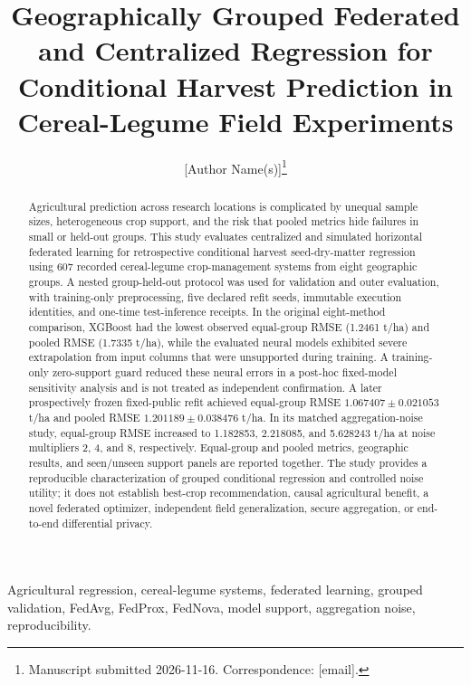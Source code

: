 \documentclass[journal]{IEEEtran}
\begin{document}
\title{Geographically Grouped Federated and Centralized Regression for
Conditional Harvest Prediction in Cereal-Legume Field Experiments}

\author{[Author Name(s)]\thanks{Manuscript submitted 2026-11-16.
Correspondence: [email].}}

\maketitle

\begin{abstract}
Agricultural prediction across research locations is complicated by unequal
sample sizes, heterogeneous crop support, and the risk that pooled metrics hide
failures in small or held-out groups. This study evaluates centralized and
simulated horizontal federated learning for retrospective conditional harvest
seed-dry-matter regression using 607 recorded cereal-legume crop-management
systems from eight geographic groups. A nested group-held-out protocol was used
for validation and outer evaluation, with training-only preprocessing, five
declared refit seeds, immutable execution identities, and one-time test-inference
receipts. In the original eight-method comparison, XGBoost had the lowest
observed equal-group RMSE (1.2461 t/ha) and pooled RMSE (1.7335 t/ha), while the
evaluated neural models exhibited severe extrapolation from input columns that
were unsupported during training. A training-only zero-support guard reduced
these neural errors in a post-hoc fixed-model sensitivity analysis and is not
treated as independent confirmation. A later prospectively frozen fixed-public
refit achieved equal-group RMSE $1.067407 \pm 0.021053$ t/ha and pooled RMSE
$1.201189 \pm 0.038476$ t/ha. In its matched aggregation-noise study, equal-group
RMSE increased to 1.182853, 2.218085, and 5.628243 t/ha at noise multipliers 2,
4, and 8, respectively. Equal-group and pooled metrics, geographic results, and
seen/unseen support panels are reported together. The study provides a
reproducible characterization of grouped conditional regression and controlled
noise utility; it does not establish best-crop recommendation, causal
agricultural benefit, a novel federated optimizer, independent field
generalization, secure aggregation, or end-to-end differential privacy.
\end{abstract}

\begin{IEEEkeywords}
Agricultural regression, cereal-legume systems, federated learning, grouped
validation, FedAvg, FedProx, FedNova, model support, aggregation noise,
reproducibility.
\end{IEEEkeywords}
\end{document}
